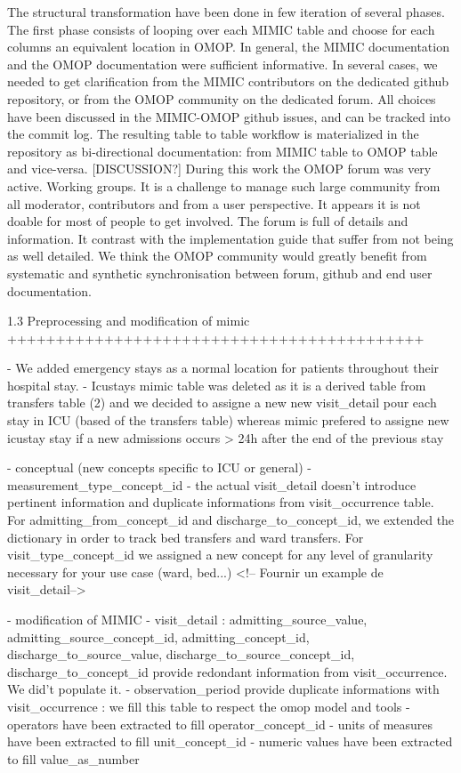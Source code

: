 The structural transformation have been done in few iteration of several phases.
The first phase consists of looping over each MIMIC table and choose for each
columns an equivalent location in OMOP. In general, the MIMIC documentation and
the OMOP documentation were sufficient informative. In several cases, we needed
to get clarification from the MIMIC contributors on the dedicated github
repository, or from the OMOP community on the dedicated forum.
All choices have been discussed in the MIMIC-OMOP github issues, and can be
tracked into the commit log. The resulting table to table workflow is
materialized in the repository as bi-directional documentation: from MIMIC
table to OMOP table and vice-versa.
[DISCUSSION?] During this work the OMOP forum was very active. Working groups.
It is a challenge to manage such large community from all moderator,
contributors and from a user perspective. It appears it is not doable for most
of people to get involved. The forum is full of details and information. It
contrast with the implementation guide that suffer from not being as well
detailed. We think the OMOP community would greatly benefit from systematic
and synthetic synchronisation between forum, github and end user documentation.

1.3 Preprocessing and modification of mimic
+++++++++++++++++++++++++++++++++++++++++++

- We added emergency stays as a normal location for patients throughout their
  hospital stay.
- Icustays mimic table was deleted as it is a derived table from transfers
  table (2) and we decided to assigne a new new visit_detail pour each stay in
  ICU (based of the transfers table) whereas mimic prefered to assigne new
  icustay stay if a new admissions occurs > 24h after the end of the previous
  stay

	- conceptual (new concepts specific to ICU or general)
		- measurement_type_concept_id
		- the actual visit_detail doesn't introduce pertinent information and duplicate informations from visit_occurrence table. For admitting_from_concept_id and discharge_to_concept_id, we extended the dictionary in order to track bed transfers and ward transfers. For visit_type_concept_id we assigned a new concept for any level of granularity necessary for your use case (ward, bed...) 
		<!-- Fournir un example de visit_detail-->

- modification of MIMIC
	- visit_detail : admitting_source_value, admitting_source_concept_id, admitting_concept_id, discharge_to_source_value, discharge_to_source_concept_id, discharge_to_concept_id provide redondant information from visit_occurrence. We did't populate it.
	- observation_period provide duplicate informations with visit_occurrence : we fill this table to respect the omop model and tools
	- operators have been extracted to fill operator_concept_id
	- units of measures have been extracted to fill unit_concept_id
	- numeric values have been extracted to fill value_as_number

